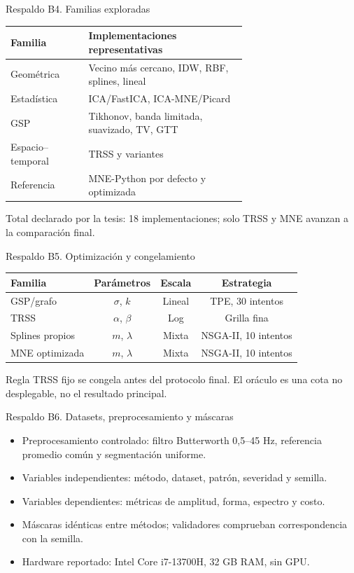 \documentclass[aspectratio=169,10pt]{beamer}
\begin{document}
\begin{frame}{Respaldo B4. Familias exploradas}
\small
\begin{tabular}{@{}lp{0.67\linewidth}@{}}
\toprule
\textbf{Familia} & \textbf{Implementaciones representativas}\\
\midrule
Geométrica & Vecino más cercano, IDW, RBF, splines, lineal\\
Estadística & ICA/FastICA, ICA-MNE/Picard\\
GSP & Tikhonov, banda limitada, suavizado, TV, GTT\\
Espacio--temporal & TRSS y variantes\\
Referencia & MNE-Python por defecto y optimizada\\
\bottomrule
\end{tabular}
\vspace{0.5em}
Total declarado por la tesis: 18 implementaciones; solo TRSS y MNE avanzan a la comparación final.
\end{frame}

\begin{frame}{Respaldo B5. Optimización y congelamiento}
\small
\begin{tabular}{@{}lccc@{}}
\toprule
\textbf{Familia} & \textbf{Parámetros} & \textbf{Escala} & \textbf{Estrategia}\\
\midrule
GSP/grafo & $\sigma$, $k$ & Lineal & TPE, 30 intentos\\
TRSS & $\alpha$, $\beta$ & Log & Grilla fina\\
Splines propios & $m$, $\lambda$ & Mixta & NSGA-II, 10 intentos\\
MNE optimizada & $m$, $\lambda$ & Mixta & NSGA-II, 10 intentos\\
\bottomrule
\end{tabular}
\vspace{0.6em}
\begin{alertblock}{Regla}
TRSS fijo se congela antes del protocolo final. El oráculo es una cota no desplegable, no el resultado principal.
\end{alertblock}
\end{frame}

\begin{frame}{Respaldo B6. Datasets, preprocesamiento y máscaras}
\small
\begin{itemize}
\item Preprocesamiento controlado: filtro Butterworth 0,5--45 Hz, referencia promedio común y segmentación uniforme.
\item Variables independientes: método, dataset, patrón, severidad y semilla.
\item Variables dependientes: métricas de amplitud, forma, espectro y costo.
\item Máscaras idénticas entre métodos; validadores comprueban correspondencia con la semilla.
\item Hardware reportado: Intel Core i7-13700H, 32 GB RAM, sin GPU.
\end{itemize}
\end{frame}
\end{document}
